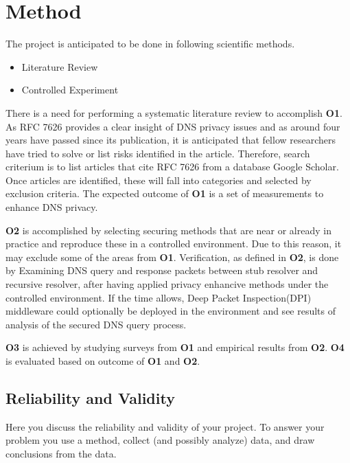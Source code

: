 \documentclass[a4paper,12pt]{article}
\begin{document}
\section{Method}
\label{Method}
The project is anticipated to be done in following scientific methods.
\begin{itemize}
\item Literature Review
\item Controlled Experiment
\end{itemize}
There is a need for performing a systematic literature review to accomplish \textbf{O1}. As RFC 7626\cite{rfc7626} provides a clear insight of DNS privacy issues and as around four years have passed since its publication, it is anticipated that fellow researchers have tried to solve or list risks identified in the article. Therefore, search criterium is to list articles that cite RFC 7626 from a database Google Scholar. Once articles are identified, these will fall into categories and selected by exclusion criteria.
The expected outcome of \textbf{O1} is a set of measurements to enhance DNS privacy.

\textbf{O2} is accomplished by selecting securing methods that are near or already in practice and reproduce these in a controlled environment. Due to this reason, it may exclude some of the areas from \textbf{O1}. Verification, as defined in \textbf{O2}, is done by Examining DNS query and response packets between stub resolver and recursive resolver, after having applied privacy enhancive methods under the controlled environment. If the time allows, Deep Packet Inspection(DPI) middleware could optionally be deployed in the environment and see results of analysis of the secured DNS query process.

\textbf{O3} is achieved by studying surveys from \textbf{O1} and empirical results from \textbf{O2}. \textbf{O4} is evaluated based on outcome of \textbf{O1} and \textbf{O2}.

\subsection{Reliability and Validity}
Here you discuss the reliability and validity of your project. To answer your problem you use a method, collect (and possibly analyze) data, and draw conclusions from the data. 
\end{document}
